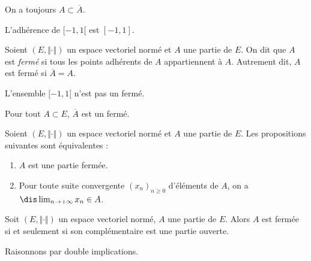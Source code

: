 \documentclass[a4paper,10pt]{report}
\begin{document}
\begin{rems}
\item On a toujours $A \subset \overline{A}$.
\item L'adhérence de $[-1,1[$ est $[-1,1]$.
\end{rems}

\begin{defin} Soient $(E, \Vert \cdot \Vert)$ un espace vectoriel normé et $A$ une partie de $E$. On dit que $A$ est \textit{fermé} si tous les points adhérents de $A$ appartiennent à $A$. Autrement dit, $A$ est fermé si $\overline{A}=A$.
\end{defin}

\begin{exems}
\item L'ensemble $[-1,1[$ n'est pas un fermé.
\item Pour tout $A \subset E$, $\overline{A}$ est un fermé.
\end{exems}

\begin{prop} Soient $(E, \Vert \cdot \Vert)$ un espace vectoriel normé et $A$ une partie de $E$. Les propositions suivantes sont équivalentes :
\begin{enumerate}
\item $A$ est une partie fermée.
\item Pour toute suite convergente $(x_n)_{n \geq 0}$ d'éléments de $A$, on a $\dis \lim_{n \rightarrow + \infty} x_n \in A$.
\end{enumerate}
\end{prop}


\begin{prop} Soit $(E, \Vert \cdot \Vert)$ un espace vectoriel normé, $A$ une partie de $E$. Alors $A$ est fermée si et seulement si son complémentaire est une partie ouverte.
\end{prop}

\begin{preuve} Raisonnons par double implications.
%
%
%

\vspace{10cm}
\end{preuve}
\end{document}
